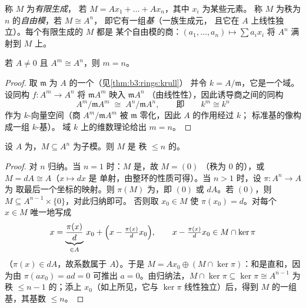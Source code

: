 \begin{definition}\label{def:b3:modules:free}
称 $M$ 为\emph{有限生成}，
若 $M = Ax_1 + \dots + Ax_n$，其中 $x_i$ 为某些元素。
称 $M$ 为秩为 $n$ 的\emph{自由模}，若 $M \cong A^n$，
即它有一组\emph{基}（一族生成元，
且它在 $A$ 上线性独立）。每个有限生成的 $M$ 都是
某个自由模的商：$(a_1, \dots, a_n) \mapsto \sum a_ix_i$
将 $A^n$ 满射到 $M$ 上。
\end{definition}

\begin{proposition}[秩的不变性]\label{prop:b3:modules:rank}
若 $A \neq 0$ 且 $A^m \cong A^n$，则 $m = n$。
\end{proposition}

\begin{proof}
取 $\mathfrak m$ 为 $A$ 的一个（见\cref{thm:b3:rings:krull}）
并令 $k = A/\mathfrak m$，它是一个域。设同构 $f \colon A^m
\to A^n$ 将 $\mathfrak m A^m$ 映入 $\mathfrak m A^n$
（由线性性），因此诱导商之间的同构
\[
A^m/\mathfrak m A^m \;\cong\; A^n/\mathfrak m A^n,
\qquad\text{即}\qquad k^m \cong k^n
\]
作为 $k$-向量空间（商 $A^m/\mathfrak m A^m$ 被
$\mathfrak m$ 零化，因此 $A$ 的作用经过 $k$；
标准基的像构成一组 $k$-基）。
域 $k$ 上的维数理论给出 $m = n$。
\end{proof}

\begin{theorem}[自由模的子模]\label{thm:b3:modules:submodule}
设 $A$ 为，$M \subseteq A^n$ 为子模。则 $M$ 是
秩 $\leq n$ 的。
\end{theorem}

\begin{proof}
对 $n$ 归纳。当 $n = 1$ 时：$M$ 是，故 $M = (0)$
（秩为 $0$ 的），或 $M = dA \cong A$（$x \mapsto dx$ 是
单射，由整环的性质可得）。当 $n > 1$ 时，设 $\pi \colon A^n \to A$ 为
取最后一个坐标的映射。则 $\pi(M)$ 为，即 $(0)$ 或 $dA$。若
$(0)$，则 $M \subseteq A^{n-1} \times \{0\}$，对此归纳即可。
否则取 $x_0 \in M$ 使 $\pi(x_0) = d$。对每个 $x \in M$
唯一地写成
\[
x = \underbrace{\frac{\pi(x)}{d}}_{\in A}\, x_0 +
\Bigl(x - \tfrac{\pi(x)}d x_0\Bigr),
\qquad x - \tfrac{\pi(x)}d x_0 \in M \cap \ker\pi
\]
（$\pi(x) \in dA$，故系数属于 $A$）。于是 $M = Ax_0
\oplus (M \cap \ker \pi)$：和是直和，因为由 $\pi(ax_0) =
ad = 0$ 可推出 $a = 0$。由归纳法，$M \cap \ker\pi \subseteq
\ker \pi \cong A^{n-1}$ 为秩 $\leq n - 1$ 的；添上
$x_0$（如上所见，它与 $\ker\pi$ 线性独立）后，得到
$M$ 的一组基，其基数 $\leq n$。
\end{proof}

